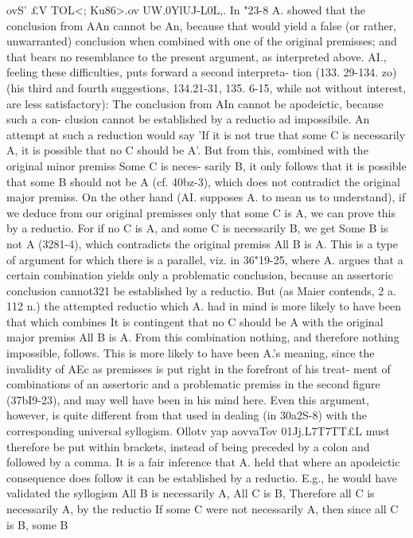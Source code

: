 {ovS' £V TOL<; Ku86>.ov UW\).0YlUJ-L0L,. In "23-8 A. showed that the
conclusion from AAn cannot be An, because that would yield
a false (or rather, unwarranted) conclusion when combined with
one of the original premisses; and that bears no resemblance
to the present argument, as interpreted above.
AI., feeling these difficulties, puts forward a second interpreta-
tion (133. 29-134. zo) (his third and fourth suggestions, 134.21-31,
135. 6-15, while not without interest, are less satisfactory): The
conclusion from AIn cannot be apodeictic, because such a con-
clusion cannot be established by a reductio ad impossibile. An
attempt at such a reduction would say 'If it is not true that some
C is necessarily A, it is possible that no C should be A'. But from
this, combined with the original minor premiss Some C is neces-
sarily B, it only follows that it is possible that some B should not
be A (cf. 40bz-3), which does not contradict the original major
premiss. On the other hand (AI. supposes A. to mean us to
understand), if we deduce from our original premisses only that
some C is A, we can prove this by a reductio. For if no C is A,
and some C is necessarily B, we get Some B is not A (3281-4),
which contradicts the original premiss All B is A.
This is a type of argument for which there is a parallel, viz. in
36"19-25, where A. argues that a certain combination yields only
a problematic conclusion, because an assertoric conclusion cannot321
be established by a reductio. But (as Maier contends, 2 a. 112 n.)
the attempted reductio which A. had in mind is more likely to
have been that which combines It is contingent that no C should
be A with the original major premiss All B is A. From this
combination nothing, and therefore nothing impossible, follows.
This is more likely to have been A.'s meaning, since the invalidity
of AEc as premisses is put right in the forefront of his treat-
ment of combinations of an assertoric and a problematic premiss
in the second figure (37bI9-23), and may well have been in his
mind here.
Even this argument, however, is quite different from that used
in dealing (in 30a2S-8) with the corresponding universal syllogism.
Ollotv yap aovvaTov 01Jj.L7T{7TT£L must therefore be put within brackets,
instead of being preceded by a colon and followed by a comma.
It is a fair inference that A. held that where an apodeictic
consequence does follow it can be established by a reductio.
E.g., he would have validated the syllogism All B is necessarily
A, All C is B, Therefore all C is necessarily A, by the reductio
If some C were not necessarily A, then since all C is B, some B
}}
